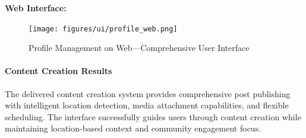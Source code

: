 \textbf{Web Interface:}
\begin{figure}[!htbp]
    \centering
    \texttt{[image: figures/ui/profile\_web.png]}
    \caption{Profile Management on Web---Comprehensive User Interface}\label{fig:web_profile}
\end{figure}

\paragraph{Content Creation Results}
The delivered content creation system provides comprehensive post publishing with intelligent location detection, media attachment capabilities, and flexible scheduling. The interface successfully guides users through content creation while maintaining location-based context and community engagement focus.

